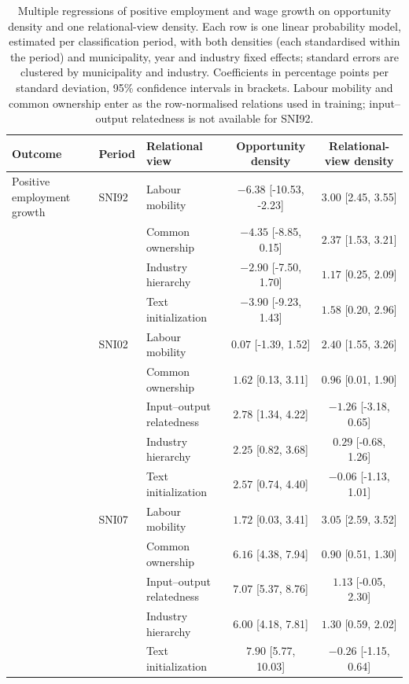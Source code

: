 \begin{table}[htbp]
\centering
\scriptsize
\caption{Multiple regressions of positive employment and wage growth on opportunity density and one relational-view density. Each row is one linear probability model, estimated per classification period, with both densities (each standardised within the period) and municipality, year and industry fixed effects; standard errors are clustered by municipality and industry. Coefficients in percentage points per standard deviation, 95\% confidence intervals in brackets. Labour mobility and common ownership enter as the row-normalised relations used in training; input--output relatedness is not available for SNI92.}
\label{tab:multiple_regression_growth-additive}
\begin{tabular}{lllcc}
\toprule
Outcome & Period & Relational view & Opportunity density & Relational-view density \\
\midrule
Positive employment growth & SNI92 & Labour mobility & $-6.38$ [-10.53, -2.23] & $3.00$ [2.45, 3.55] \\
 &  & Common ownership & $-4.35$ [-8.85, 0.15] & $2.37$ [1.53, 3.21] \\
 &  & Industry hierarchy & $-2.90$ [-7.50, 1.70] & $1.17$ [0.25, 2.09] \\
 &  & Text initialization & $-3.90$ [-9.23, 1.43] & $1.58$ [0.20, 2.96] \\
\addlinespace[2pt]
 & SNI02 & Labour mobility & $0.07$ [-1.39, 1.52] & $2.40$ [1.55, 3.26] \\
 &  & Common ownership & $1.62$ [0.13, 3.11] & $0.96$ [0.01, 1.90] \\
 &  & Input--output relatedness & $2.78$ [1.34, 4.22] & $-1.26$ [-3.18, 0.65] \\
 &  & Industry hierarchy & $2.25$ [0.82, 3.68] & $0.29$ [-0.68, 1.26] \\
 &  & Text initialization & $2.57$ [0.74, 4.40] & $-0.06$ [-1.13, 1.01] \\
\addlinespace[2pt]
 & SNI07 & Labour mobility & $1.72$ [0.03, 3.41] & $3.05$ [2.59, 3.52] \\
 &  & Common ownership & $6.16$ [4.38, 7.94] & $0.90$ [0.51, 1.30] \\
 &  & Input--output relatedness & $7.07$ [5.37, 8.76] & $1.13$ [-0.05, 2.30] \\
 &  & Industry hierarchy & $6.00$ [4.18, 7.81] & $1.30$ [0.59, 2.02] \\
 &  & Text initialization & $7.90$ [5.77, 10.03] & $-0.26$ [-1.15, 0.64] \\

\end{tabular}
\end{table}
